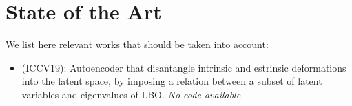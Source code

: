 \section{State of the Art}
\label{sec:related}
We list here relevant works that should be taken into account:
\begin{itemize}
    \item \cite{aumentado19} (ICCV19): Autoencoder that disantangle intrinsic and estrinsic deformations into the latent space, by imposing a relation between a subset of latent variables and eigenvalues of LBO. \emph{No code available} 
\end{itemize}